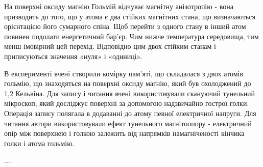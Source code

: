 \documentclass[a4paper,14pt]{extreport}
\begin{document}
  На поверхні оксиду магнію Гольмій відчуває магнітну анізотропію - вона призводить до того, що у атома є два стійких магнітних стана, що визначаються орієнтацією його сумарного спіна. Щоб перейти з одного стану в інший атом повинен подолати енергетичний бар'єр. Чим нижче температура середовища, тим менш імовірний цей перехід. Відповідно цим двох стійким станам і приписуються значення «нуля» і «одиниці».\par

  В експерименті вчені створили комірку пам'яті, що складалася з двох атомів гольмію, що знаходяться на поверхні оксиду магнію, який був охолоджений до 1,2 Кельвіна. Для запису і читання вчені використовували скануючий тунельний мікроскоп, який досліджує поверхні за допомогою надзвичайно гострої голки. Операція запису полягала в додаванні до атому певної електричної напруги. Для читання автори використовували ефект тунельного магнітоопору - електричний опір між поверхнею і голкою залежить від напрямків намагніченості кінчика голки і атома гольмію. \par

....

\end{document}
